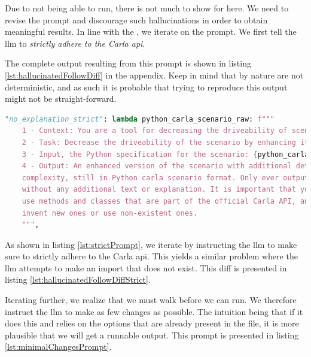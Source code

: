 Due to not being able to run, there is not much to show for here. We need to revise the prompt and
discourage such hallucinations in order to obtain meaningful results. In line with the
, we iterate on the prompt. We first tell the \acrshort{llm} to
\emph{strictly adhere to the Carla \acrshort{api}}.

The complete output resulting from this prompt is shown in listing \ref{lst:hallucinatedFollowDiff}
in the appendix.
Keep in mind that  by nature are not deterministic, and as such it is probable
that trying to reproduce this output might not be straight-forward.

\begin{lstlisting}[language=python, label={lst:strictPrompt}, caption={A slightly more advanced prompt instructing the \acrshort{llm} to strictly adhere to the Carla \acrshort{api}.}]
        "no_explanation_strict": lambda python_carla_scenario_raw: f"""
    1 - Context: You are a tool for decreasing the driveability of scenarios in the driving simulator Carla.
    2 - Task: Decrease the driveability of the scenario by enhancing it with more details and complexity.
    3 - Input, the Python specification for the scenario: {python_carla_scenario_raw}
    4 - Output: An enhanced version of the scenario with additional details and
    complexity, still in Python carla scenario format. Only ever output the code,
    without any additional text or explanation. It is important that you only
    use methods and classes that are part of the official Carla API, and do not
    invent new ones or use non-existent ones.
    """,
\end{lstlisting}

As shown in listing \ref{lst:strictPrompt}, we iterate by instructing the \acrshort{llm} to make
sure to strictly adhere to the Carla \acrshort{api}. This yields a similar problem where the
\acrshort{llm} attempts to make an import that does not exist. This diff is presented in listing
\ref{lst:hallucinatedFollowDiffStrict}.

Iterating further, we realize that we must walk before we can run. We therefore instruct the
\acrshort{llm} to make as few changes as possible. The intuition being that if it does this and
relies on the options that are already present in the file, it is more plausible that we will get a
runnable output. This prompt is presented in listing \ref{lst:minimalChangesPrompt}.

